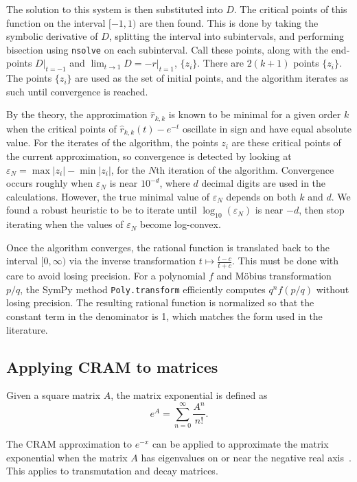 The solution to this system is then substituted into $D$. The critical points
of this function on the interval $[-1, 1)$ are then found. This is done by
taking the symbolic derivative of $D$, splitting the interval into
subintervals, and performing bisection using \texttt{nsolve} on each
subinterval. Call these points, along with the end-points $D|_{t=-1}$ and
$\lim_{t\to 1} D=-r|_{t=1}$, $\{z_i\}$. There are $2(k+1)$ points $\{z_i\}$. The
points $\{z_i\}$ are used as the set of initial points, and the algorithm iterates
as such until convergence is reached.

By the theory, the approximation $\hat{r}_{k, k}$ is known to be minimal for a
given order $k$ when the critical points of $\hat{r}_{k, k}(t) - e^{-t}$
oscillate in sign and have equal absolute value. For the iterates of the
algorithm, the points $z_i$ are these critical points of the current
approximation, so convergence is detected by looking at
$\varepsilon_N = \max{|z_i|} - \min{|z_i|}$, for the $N$th iteration of the
algorithm. Convergence occurs roughly when $\varepsilon_N$ is near $10^{-d}$,
where $d$ decimal digits are used in the calculations. However, the true
minimal value of $\varepsilon_N$ depends on both $k$ and $d$. We found a
robust heuristic to be to iterate until $\log_{10}{(\varepsilon_N)}$ is near $-d$,
then stop iterating when the values of $\varepsilon_N$ become log-convex.

Once the algorithm converges, the rational function is translated back to the
interval $[0, \infty)$ via the inverse transformation $t\mapsto \frac{t - c}{t
  + c}$. This must be done with care to avoid losing precision. For a
polynomial $f$ and M\"{o}bius transformation~\cite{ationneeded} $p/q$, the SymPy
method \texttt{Poly.transform} efficiently computes
$q^nf\left(p/q\right)$ without losing precision. The resulting
rational function is normalized so that the constant term in the denominator
is 1, which matches the form used in the literature.~\cite{ationneeded}

\subsection{Applying CRAM to matrices}
Given a square matrix $A$, the matrix exponential is defined
as~\cite{ationneeded}
\begin{equation}
  e^{A} = \sum_{n=0}^\infty \frac{A^n}{n!}.
\end{equation}

The CRAM approximation to $e^{-x}$ can be applied to approximate the matrix
exponential when the matrix $A$ has eigenvalues on or near the negative real
axis~\cite{pusa2010computing}. This applies to transmutation and decay
matrices.


